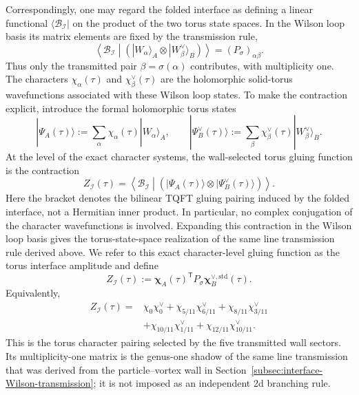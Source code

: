 \documentclass[11pt,a4paper]{article}
\numberwithin{equation}{section}
\begin{document}
Correspondingly, one may regard the folded interface as defining a linear functional $\langle\mathcal B_{\mathcal I}|$ on the product of the two torus state spaces.  In the Wilson loop basis its matrix elements are fixed by the transmission rule,
\[
  \left\langle\mathcal B_{\mathcal I}\middle|
  \left(
  |W_\alpha\rangle_A\otimes|W_\beta^\vee\rangle_B
  \right)\right\rangle
  =(P_\sigma)_{\alpha\beta}.
\]
Thus only the transmitted pair $\beta=\sigma(\alpha)$ contributes, with multiplicity one.  The characters $\chi_\alpha(\tau)$ and $\chi_\beta^\vee(\tau)$ are the holomorphic solid-torus wavefunctions associated with these Wilson loop states.  To make the contraction explicit, introduce the formal holomorphic torus states
\[
  |\Psi_A(\tau)\rangle
  :=\sum_\alpha \chi_\alpha(\tau)|W_\alpha\rangle_A,
  \qquad
  |\Psi_B^\vee(\tau)\rangle
  :=\sum_\beta \chi_\beta^\vee(\tau)|W_\beta^\vee\rangle_B.
\]
At the level of the exact character systems, the wall-selected torus gluing function is the contraction
\[
  Z_{\mathcal I}(\tau)
  =\left\langle\mathcal B_{\mathcal I}\middle|
  \left(
  |\Psi_A(\tau)\rangle\otimes|\Psi_B^\vee(\tau)\rangle
  \right)\right\rangle.
\]
Here the bracket denotes the bilinear TQFT gluing pairing induced by the folded interface, not a Hermitian inner product.  In particular, no complex conjugation of the character wavefunctions is involved.  Expanding this contraction in the Wilson loop basis gives the torus-state-space realization of the same line transmission rule derived above.  We refer to this exact character-level gluing function as the torus interface amplitude and define
\begin{equation}
  Z_{\mathcal I}(\tau)
  :=
  \boldsymbol\chi_A(\tau)^{\mathsf T}
  P_\sigma
  \boldsymbol\chi_B^{\vee,\mathrm{std}}(\tau).
  \label{eq:interface-genus-one-amplitude-matrix}
\end{equation}
Equivalently,
\begin{align}
  Z_{\mathcal I}(\tau)
  ={}&
  \chi_0\chi_0^\vee
  +\chi_{5/11}\chi_{6/11}^\vee
  +\chi_{8/11}\chi_{3/11}^\vee
  \nonumber\\
  &+\chi_{10/11}\chi_{1/11}^\vee
  +\chi_{12/11}\chi_{10/11}^\vee.
  \label{eq:interface-five-sector-bilinear}
\end{align}
This is the torus character pairing selected by the five transmitted wall sectors.  Its multiplicity-one matrix is the genus-one shadow of the same line transmission that was derived from the particle--vortex wall in Section~\ref{subsec:interface-Wilson-transmission}; it is not imposed as an independent 2d branching rule.
\end{document}
